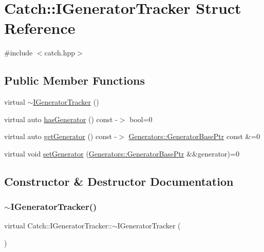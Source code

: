 \hypertarget{struct_catch_1_1_i_generator_tracker}{}\section{Catch\+::I\+Generator\+Tracker Struct Reference}
\label{struct_catch_1_1_i_generator_tracker}


{\ttfamily \#include $<$catch.\+hpp$>$}

\subsection*{Public Member Functions}
\begin{DoxyCompactItemize}
\item 
virtual \mbox{\hyperlink{struct_catch_1_1_i_generator_tracker_a20b3c82baa68f821c180d6dac1234eb1}{$\sim$\+I\+Generator\+Tracker}} ()
\item 
virtual auto \mbox{\hyperlink{struct_catch_1_1_i_generator_tracker_ae88084f9af27c8b9a5d5775b9c148498}{has\+Generator}} () const -\/$>$ bool=0
\item 
virtual auto \mbox{\hyperlink{struct_catch_1_1_i_generator_tracker_a23be942fc51672598bfa02c678c3078a}{get\+Generator}} () const -\/$>$ \mbox{\hyperlink{namespace_catch_1_1_generators_a1519f304113619d7d18670e2f08276c0}{Generators\+::\+Generator\+Base\+Ptr}} const \&=0
\item 
virtual void \mbox{\hyperlink{struct_catch_1_1_i_generator_tracker_a9945eff42219edc5a7071eebd8b0419e}{set\+Generator}} (\mbox{\hyperlink{namespace_catch_1_1_generators_a1519f304113619d7d18670e2f08276c0}{Generators\+::\+Generator\+Base\+Ptr}} \&\&generator)=0
\end{DoxyCompactItemize}


\subsection{Constructor \& Destructor Documentation}
\mbox{\label{struct_catch_1_1_i_generator_tracker_a20b3c82baa68f821c180d6dac1234eb1}} 
\subsubsection{\texorpdfstring{$\sim$IGeneratorTracker()}{~IGeneratorTracker()}}
{\footnotesize\ttfamily virtual Catch\+::\+I\+Generator\+Tracker\+::$\sim$\+I\+Generator\+Tracker (\begin{DoxyParamCaption}{ }\end{DoxyParamCaption})\hspace{0.3cm}{\ttfamily [virtual]}}



